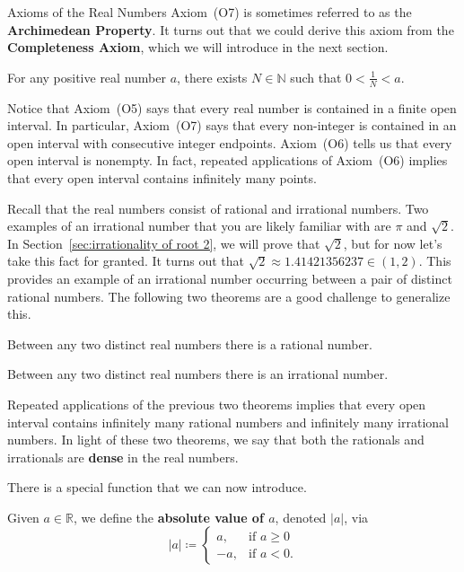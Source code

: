 \begin{section}{Axioms of the Real Numbers}
Axiom~(O7) is sometimes referred to as the \textbf{Archimedean Property}. It turns out that we could derive this axiom from the \textbf{Completeness Axiom}, which we will introduce in the next section.

\begin{theorem}
For any positive real number $a$, there exists $N\in \mathbb{N}$ such that $0<\frac{1}{N}<a$.
\end{theorem}

Notice that Axiom~(O5) says that every real number is contained in a finite open interval. In particular, Axiom~(O7) says that every non-integer is contained in an open interval with consecutive integer endpoints. Axiom~(O6) tells us that every open interval is nonempty. In fact, repeated applications of Axiom~(O6) implies that every open interval contains infinitely many points.

Recall that the real numbers consist of rational and irrational numbers.  Two examples of an irrational number that you are likely familiar with are $\pi$ and  $\sqrt{2}$. In Section~\ref{sec:irrationality of root 2}, we will prove that $\sqrt{2}$, but for now let's take this fact for granted. It turns out that $\sqrt{2}\approx 1.41421356237\in (1,2)$. This provides an example of an irrational number occurring between a pair of distinct rational numbers. The following two theorems are a good challenge to generalize this.

\begin{theorem}\label{thm:rationals dense}
Between any two distinct real numbers there is a rational number.
\end{theorem}

\begin{theorem}\label{thm:irrationals dense}
Between any two distinct real numbers there is an irrational number.
\end{theorem}

Repeated applications of the previous two theorems implies that every open interval contains infinitely many rational numbers and infinitely many irrational numbers. In light of these two theorems, we say that both the rationals and irrationals are \textbf{dense} in the real numbers. 

There is a special function that we can now introduce. 

\begin{definition}
Given $a\in\mathbb{R}$, we define the \textbf{absolute value of $a$}, denoted $|a|$, via
\[
|a|\coloneqq \begin{cases}
a, & \text{if }a\geq 0\\
-a, & \text{if }a<0.
\end{cases}
\]
\end{definition}


\end{section}
